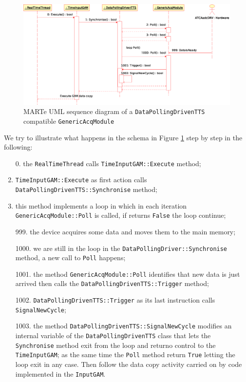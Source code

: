 \begin{figure}[h!]
 \begin{center}
  \includegraphics[width=\textwidth]{MARTe/DataPollingDrivenTTS.eps}
  \caption{MARTe UML sequence diagram of a \texttt{DataPollingDrivenTTS} compatible \texttt{GenericAcqModule}}
  \label{f:MARTe:GACQM:DataPollingDrivenTTS}
 \end{center}
\end{figure}

We try to illustrate what happens in the schema in Figure \ref{f:MARTe:GACQM:DataPollingDrivenTTS} step by step in the following:

\begin{enumerate}
 \item[0.] the \texttt{RealTimeThread} calls \texttt{TimeInputGAM::Execute} method;
 \item \texttt{TimeInputGAM::Execute} as first action calls \texttt{DataPollingDrivenTTS::Synchronise} method;
 \item this method implements a loop in which in each iteration \texttt{GenericAcqModule::Poll} is called, if returns \texttt{False} the loop continue;

 \item[999.] the device acquires some data and moves them to the main memory;
 \item[1000.] we are still in the loop in the \texttt{DataPollingDriver::Synchronise} method, a new call to \texttt{Poll} happens;
 \item[1001.] the method \texttt{GenericAcqModule::Poll} identifies that new data is just arrived then calls the \texttt{DataPollingDrivenTTS::Trigger} method;
 \item[1002.] \texttt{DataPollingDrivenTTS::Trigger} as its last instruction calls \texttt{SignalNewCycle};
 \item[1003.] the method \texttt{DataPollingDrivenTTS::SignalNewCycle} modifies an internal variable of the \texttt{DataPollingDrivenTTS} class that lets the \texttt{Synchronise} method exit from the loop and returno control to the \texttt{TimeInputGAM}; as the same time the \texttt{Poll} method return \texttt{True} letting the loop exit in any case. Then follow the data copy activity carried on by code implemented in the \texttt{InputGAM}.
\end{enumerate}

